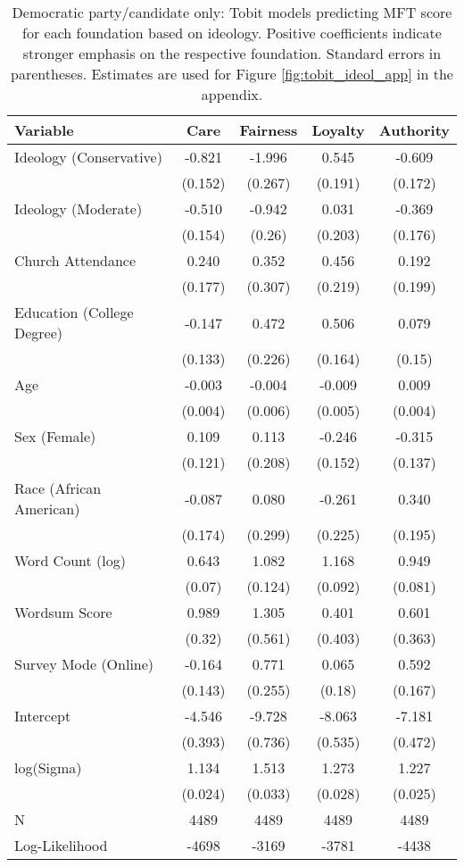 \begin{table}[ht]
\centering
\caption{Democratic party/candidate only: Tobit models predicting MFT score for each foundation based 
           on ideology. Positive coefficients indicate stronger emphasis on the respective 
           foundation. Standard errors in parentheses. Estimates are used for 
           Figure \ref{fig:tobit_ideol_app} in the appendix.} 
\label{tab:tobit_dem}
\begingroup\footnotesize
\begin{tabular}{lcccc}
  \hline
Variable & Care & Fairness & Loyalty & Authority \\ 
  \hline
Ideology (Conservative) & -0.821 & -1.996 &  0.545 & -0.609 \\ 
   & (0.152) & (0.267) & (0.191) & (0.172) \\ 
  Ideology (Moderate) & -0.510 & -0.942 &  0.031 & -0.369 \\ 
   & (0.154) & (0.26) & (0.203) & (0.176) \\ 
  Church Attendance &  0.240 &  0.352 &  0.456 &  0.192 \\ 
   & (0.177) & (0.307) & (0.219) & (0.199) \\ 
  Education (College Degree) & -0.147 &  0.472 &  0.506 &  0.079 \\ 
   & (0.133) & (0.226) & (0.164) & (0.15) \\ 
  Age & -0.003 & -0.004 & -0.009 &  0.009 \\ 
   & (0.004) & (0.006) & (0.005) & (0.004) \\ 
  Sex (Female) &  0.109 &  0.113 & -0.246 & -0.315 \\ 
   & (0.121) & (0.208) & (0.152) & (0.137) \\ 
  Race (African American) & -0.087 &  0.080 & -0.261 &  0.340 \\ 
   & (0.174) & (0.299) & (0.225) & (0.195) \\ 
  Word Count (log) &  0.643 &  1.082 &  1.168 &  0.949 \\ 
   & (0.07) & (0.124) & (0.092) & (0.081) \\ 
  Wordsum Score &  0.989 &  1.305 &  0.401 &  0.601 \\ 
   & (0.32) & (0.561) & (0.403) & (0.363) \\ 
  Survey Mode (Online) & -0.164 &  0.771 &  0.065 &  0.592 \\ 
   & (0.143) & (0.255) & (0.18) & (0.167) \\ 
  Intercept & -4.546 & -9.728 & -8.063 & -7.181 \\ 
   & (0.393) & (0.736) & (0.535) & (0.472) \\ 
  log(Sigma) &  1.134 &  1.513 &  1.273 &  1.227 \\ 
   & (0.024) & (0.033) & (0.028) & (0.025) \\ 
   \hline
N & 4489 & 4489 & 4489 & 4489 \\ 
  Log-Likelihood & -4698 & -3169 & -3781 & -4438 \\ 
   \hline
\end{tabular}
\endgroup
\end{table}
